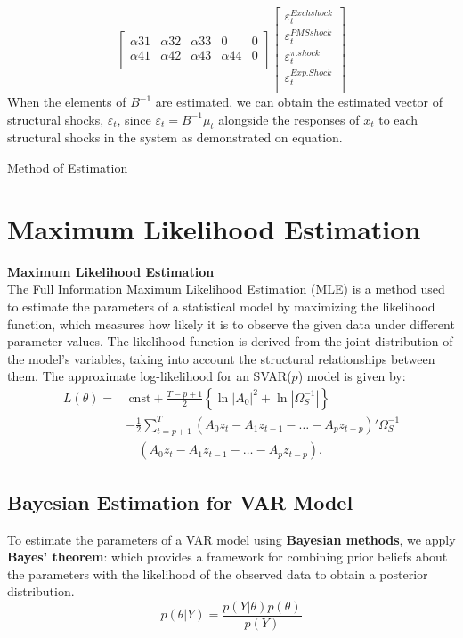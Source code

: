 \documentclass{beamer}
\begin{document}
{\begin{frame}
\begin{equation}
\begin{bmatrix}
\alpha31 &\alpha32 &\alpha33&0&0\\
\alpha41 &\alpha42 &\alpha43&\alpha44&0\\
\end{bmatrix}
\begin{bmatrix}
\varepsilon_t^{Exch shock}\\
\varepsilon_t^{PMS shock}\\
\varepsilon_t^{\pi. shock}\\
\varepsilon_t^{Exp.Shock}\\
\end{bmatrix}
\end{equation}
When the elements of $B^{-1}$ are estimated, we can obtain the estimated vector of structural shocks, $\varepsilon_t$, since $\varepsilon_t= B^{-1}\mu_t$ alongside the responses of $x_t$ to each structural shocks in the system as demonstrated on equation.
\end{frame}
\begin{frame} {Method of Estimation}
\section*{Maximum Likelihood Estimation}
\textbf{{Maximum Likelihood Estimation}}\\
The Full Information Maximum Likelihood Estimation (MLE) is a method used to estimate the parameters of a statistical model by maximizing the likelihood function, which measures how likely it is to observe the given data under different parameter values. The likelihood function is derived from the joint distribution of the model's variables, taking into account the structural relationships between them.
The approximate log-likelihood for an SVAR(\(p\)) model is given by:
\begin{align*}
L(\theta) = & \ \text{cnst} + \frac{T - p + 1}{2} \left\{ \ln |A_0|^2 + \ln |\Omega_S^{-1}| \right\} \\
& - \frac{1}{2} \sum_{t = p + 1}^{T} \left( A_0 z_t - A_1 z_{t-1} - \dots - A_p z_{t-p} \right)' \Omega_S^{-1} \\
& \quad \left( A_0 z_t - A_1 z_{t-1} - \dots - A_p z_{t-p} \right).
\end{align*}

\end{frame}
\begin{frame} 
\section*{Bayesian Estimation for VAR Model}
To estimate the parameters of a VAR model using  \textbf{Bayesian methods}, we apply \textbf{Bayes' theorem}: which provides a framework for combining prior beliefs about the parameters with the likelihood of the observed data to obtain a posterior distribution.
\begin{equation}
p(\theta | Y) = \frac{p(Y | \theta) p(\theta)}{p(Y)}
\end{equation}


\end{frame}}
\end{document}
